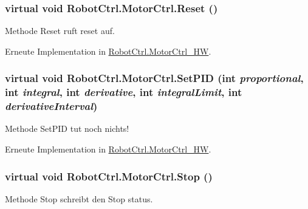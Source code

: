 \hypertarget{class_robot_ctrl_1_1_motor_ctrl_a57b1bb7cb3895bc5d867848926b57f1e}{
\subsubsection[{Reset}]{\setlength{\rightskip}{0pt plus 5cm}virtual void RobotCtrl.MotorCtrl.Reset ()}}
\label{class_robot_ctrl_1_1_motor_ctrl_a57b1bb7cb3895bc5d867848926b57f1e}
Methode Reset ruft reset auf. 

Erneute Implementation in \hyperlink{class_robot_ctrl_1_1_motor_ctrl___h_w_a1a116e83d87c50119567ff4ae334b239}{RobotCtrl.MotorCtrl\_\-HW}.

\hypertarget{class_robot_ctrl_1_1_motor_ctrl_ac6e7ec6b155d337dddf2fe1bc660c11b}{
\subsubsection[{SetPID}]{\setlength{\rightskip}{0pt plus 5cm}virtual void RobotCtrl.MotorCtrl.SetPID (int {\em proportional}, \/  int {\em integral}, \/  int {\em derivative}, \/  int {\em integralLimit}, \/  int {\em derivativeInterval})}}
\label{class_robot_ctrl_1_1_motor_ctrl_ac6e7ec6b155d337dddf2fe1bc660c11b}
Methode SetPID tut noch nichts! 

Erneute Implementation in \hyperlink{class_robot_ctrl_1_1_motor_ctrl___h_w_a24f22cd266cce1e701f9823e02816ff5}{RobotCtrl.MotorCtrl\_\-HW}.

\hypertarget{class_robot_ctrl_1_1_motor_ctrl_a4e61bcac558a43dd2d1470ded5fed820}{
\subsubsection[{Stop}]{\setlength{\rightskip}{0pt plus 5cm}virtual void RobotCtrl.MotorCtrl.Stop ()}}
\label{class_robot_ctrl_1_1_motor_ctrl_a4e61bcac558a43dd2d1470ded5fed820}
Methode Stop schreibt den Stop status. 

